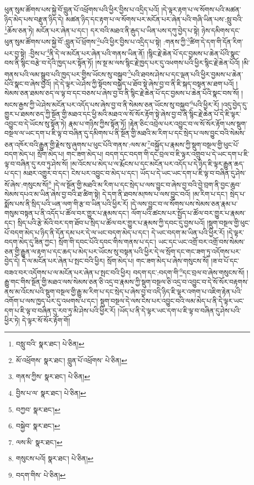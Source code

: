 ཕུན་སུམ་ཚོགས་པས་སྐྱེ་བོ་བླུན་པོ་འཕྲོགས་པའི་ཕྱིར་བྱིས་པ་འདྲིད་པའོ། །དེ་ལྟར་རྟག་པ་ལ་སོགས་པའི་མཚན་ཉིད་མེད་པས་བརྫུན་ཉིད་དེ། མཚན་ཉིད་དང་རྟག་པ་ལ་སོགས་པར་མངོན་པར་ཞེན་པའི་གཞི་ཡིན་པས་:སླུ་བའི་\footnote{བསླུ་བའི་  སྣར་ཐང་།  པེ་ཅིན། }ཆོས་ཅན་ཏེ། མངོན་པར་ཞེན་པ་དང་། དར་བའི་མཐའ་ནི་རྒུད་པ་ཡིན་པས་དཀུ་བྱེད་པ་སྟེ། ཉེས་དམིགས་དང་ཕུན་སུམ་ཚོགས་པས་སྐྱེ་བོ་:བླུན་པོ་ཕྲོགས་\footnote{མོ་འཕྲོགས་  སྣར་ཐང་། བླུན་པོ་འཕྲོགས་  པེ་ཅིན། }པའི་ཕྱིར་བྱིས་པ་འདྲིད་པ་སྟེ། :གནས་ཀྱི་\footnote{གནས་ཀྱིས་  སྣར་ཐང་།  པེ་ཅིན། }ཚིག་དེ་དག་གི་དོན་རིག་པར་བྱ་སྟེ། :བྱིས་པ་\footnote{བྱིས་པ་ལ་  སྣར་ཐང་།  པེ་ཅིན། }ནི་དེ་ལ་མངོན་པར་ཞེན་པའི་གནས་ཡིན་ནོ། །སྙིང་རྗེ་ཆེན་པོ་དང་བྱམས་པ་ཆེན་པོའི་སྣང་བས་ནི་སྙིང་བརྩེ་བ་དེའི་ཁྱད་པར་སྟོན་ཏོ། །ས་སྔ་མ་ལས་སྙིང་རྗེ་ཁྱད་པར་དུ་འཕགས་པའི་ཕྱིར་སྙིང་རྗེ་ཆེན་པོའོ། །མི་གནས་པའི་ལམ་སྒྲུབ་པའི་ཁྱད་པར་གྱིས་ཡོངས་སུ་བསྐྱབ་\footnote{བཀྱབ་  སྣར་ཐང་། }པའི་ཐབས་ཤེས་པ་དང་ལྡན་པའི་ཕྱིར་བྱམས་པ་ཆེན་པོའི་སྣང་བ་ཞེས་བྱའོ། །དེ་དེ་ལྟར་ཡེ་ཤེས་ཀྱི་སྟོབས་བསྐྱེད་པ་ཐོབ་སྟེ་ཞེས་བྱ་བ་ནི་ཇི་སྐད་བསྟན་མ་ཐག་པའོ། །སེམས་ཅན་ཐམས་ཅད་ལ་ལྟ་བ་དང་བཅས་པ་ཞེས་བྱ་བ་ནི་སྙིང་རྗེ་ཆེན་པོ་དང་བྱམས་པ་ཆེན་པོའི་སྣང་བས་སོ། །སངས་རྒྱས་ཀྱི་ཡེ་ཤེས་མངོན་པར་འདོད་པས་ཞེས་བྱ་བ་ནི་སེམས་ཅན་ཡོངས་སུ་བསྐྱབ་\footnote{བསྐྱེབ་  སྣར་ཐང་། }པའི་ཕྱིར་རོ། །འདུ་བྱེད་དུ་གྱུར་པ་ཐམས་ཅད་ཀྱི་སྔོན་གྱི་མཐའ་དང་ཕྱི་མའི་མཐའ་ལ་སོ་སོར་རྟོག་སྟེ་ཞེས་བྱ་བ་ནི་སྙིང་རྗེ་ཆེན་པོ་དེ་ཇི་ལྟར་འབྱུང་བ་དེ་ཡོངས་སུ་སྟོན་ཏེ། རྣམ་པ་གཉིས་ཀྱིས་སྟོན་ཏོ། །རྟེན་ཅིང་འབྲེལ་པར་འབྱུང་བ་ལ་སོ་སོར་རྟོག་པས་སྡུག་བསྔལ་ལ་ཡང་དག་པ་ཇི་ལྟ་བ་བཞིན་དུ་དམིགས་པ་ནི་སྔོན་གྱི་མཐའི་མ་རིག་པ་དང་སྲེད་པ་ལས་བྱུང་བའི་སེམས་ཅན་འཁོར་བའི་རྒྱུན་གྱི་རྗེས་སུ་ཞུགས་པ་ཕུང་པོའི་གནས་:ལས་མ་\footnote{ལས་མི་  སྣར་ཐང་། }བསྐྱོད་པ་རྣམས་ཀྱི་སྡུག་བསྔལ་གྱི་ཕུང་པོ་བདག་མེད་པ། སྲོག་མེད་པ། གང་ཟག་མེད་པ། བདག་དང་བདག་གི་དང་བྲལ་བ་ཇི་ལྟར་འགྲུབ་པ་དེ་ཡང་དག་པ་ཇི་ལྟ་བ་བཞིན་དུ་རབ་ཏུ་ཤེས་སོ། །མ་འོངས་པ་མེད་པ་ལ་རྨོངས་པ་དང་མངོན་པར་འདོད་པ་དེ་ཉིད་ཇི་ལྟར་རྒྱུན་ཆད་པ་དང་། མཐར་འགྱུར་བ་དང་། ངེས་པར་འབྱུང་བ་མེད་པ་དང་། ཡོད་པ་དེ་ཡང་ཡང་དག་པ་ཇི་ལྟ་བ་བཞིན་དུ་ཤེས་སོ་ཞེས་:གསུངས་སོ།\footnote{གསུངས་པའོ།  སྣར་ཐང་།  པེ་ཅིན། } །དེ་ལ་སྔོན་གྱི་མཐའི་མ་རིག་པ་དང་སྲེད་པ་ལས་བྱུང་བ་ཞེས་བྱ་བའི་བྱེ་བྲག་ནི་བྱང་ཆུབ་སེམས་དཔའ་མ་ཡིན་ཞེས་བྱ་བའི་ཐ་ཚིག་སྟེ། དེ་དག་ནི་ཐབས་མཁས་པ་ལས་བྱུང་བའོ། །མ་རིག་པ་དང་། སྲེད་པ་སྨོས་པས་ནི་སྲིད་པའི་ཡན་ལག་གི་རྩ་བ་ཡིན་པའི་ཕྱིར་རོ། །དེ་ལས་བྱུང་བ་ལ་སོགས་པས་སེམས་ཅན་རྣམ་པ་གསུམ་བསྟན་པ་ནི་འདོད་པ་ཚོལ་བར་གྱུར་པ་རྣམས་དང་། ལོག་པའི་ཚངས་པར་སྤྱོད་པ་ཚོལ་བར་གྱུར་པ་རྣམས་དང་། སྲིད་པའི་རྩེ་མོའི་བར་དག་ཐོབ་པ་སྲིད་པ་ཚོལ་བར་གྱུར་པ་རྣམས་ཀྱི་དབང་དུ་བྱས་པའོ། །སྡུག་བསྔལ་གྱི་ཕུང་པོ་བདག་མེད་པ་ཉིད་ནི་དོན་དམ་པར་དེ་ལ་ཡང་བདག་མེད་པ་དང་། དེ་ཡང་བདག་མ་ཡིན་པའི་ཕྱིར་རོ། །དེ་ལྟར་བདག་མེད་དུ་ཟིན་ཀྱང་། སྲོག་གི་དབང་པོའི་དབང་གིས་གནས་པ་དང་། ཡང་དང་ཡང་འགྲོ་བར་འགྲོ་བས་སེམས་ཅན་གྱི་རྒྱུན་ལ་རྟག་པ་དང་ཆད་པ་མེད་པར་ཡོངས་སུ་བསྟན་པའི་ཕྱིར་དེ་ལ་སྲོག་དང་གང་ཟག་ཏུ་འདོགས་པར་བྱེད་དེ། དེ་ལ་མངོན་པར་ཞེན་པ་སྤང་བའི་ཕྱིར། སྲོག་མེད་པ། གང་ཟག་མེད་པ་ཞེས་གསུངས་སོ། །ཟ་བ་པོ་དང་བཟའ་བར་འདོགས་པ་ལ་མངོན་པར་ཞེན་པ་སྤང་བའི་ཕྱིར། བདག་དང་:བདག་གི་\footnote{བདག་གིས་  པེ་ཅིན། }དང་བྲལ་བ་ཞེས་གསུངས་སོ། །རྒྱུ་གང་གིས་སྔོན་གྱི་མཐའ་ལས་སེམས་ཅན་ཅི་འདྲ་བ་རྣམས་ཀྱི་སྡུག་བསྔལ་ཅི་འདྲ་བ་འབྱུང་བ་དེ་སོ་སོར་བརྟགས་ནས་མ་འོངས་པའི་སྡུག་བསྔལ་གྱི་རྒྱུ་མ་རིག་པ་དང་སྲེད་པ་ཞེས་བྱ་བ་འདི་ཉིད་ཇི་ལྟར་འགག་པ་འཇིག་རྟེན་པའི་འགོག་པ་ལས་ཁྱད་པར་དུ་འཕགས་པ་དང་། སྡུག་བསྔལ་དེ་ལས་ངེས་པར་འབྱུང་བའི་ལམ་མེད་པ་ནི་དེ་ལྟར་ཡང་དག་པ་ཇི་ལྟ་བ་བཞིན་དུ་རབ་ཏུ་མི་ཤེས་པའི་ཕྱིར་རོ། །ཡོད་པ་ནི་དེ་ལྟར་ཡང་དག་པ་ཇི་ལྟ་བ་བཞིན་དུ་ཤེས་པའི་ཕྱིར་ཏེ། དེ་ལྟར་སོ་སོར་རྟོག་གོ། 